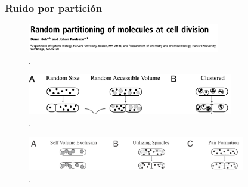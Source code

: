 \documentclass{beamer}
\begin{document}






\begin{frame}
\frametitle{Ruido por partici\'on}
\begin{figure}[p]
    \centering
    \includegraphics[width=0.75\textwidth]{huh11.png}\\
    \tiny \cite{huh11b}.
\end{figure}

\begin{figure}[p]
    \centering
    \includegraphics[width=0.8\textwidth]{order.png}\\
    \tiny \cite{huh11b}.
\end{figure}

\begin{figure}[p]
    \centering
    \includegraphics[width=0.85\textwidth]{disorder.png}\\
    \tiny \cite{huh11b}.
\end{figure}

\end{frame}
\end{document}
